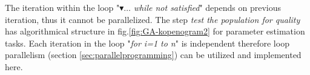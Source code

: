 The iteration within the loop "$\blacktriangledown \ldots$ \emph{while not satisfied}" depends on previous iteration, thus it cannot be parallelized.
The step \emph{test the population for quality} has algorithmical structure in fig.\ref{fig:GA-kopenogram2} for parameter estimation tasks. Each iteration in the loop "\emph{for i=1 to n}" is independent therefore loop parallelism (section \ref{sec:parallelprogramming}) can be utilized and implemented here.



